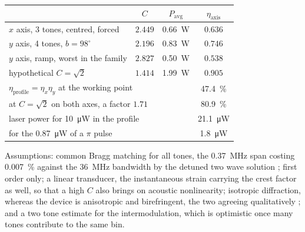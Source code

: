 \begin{center}
\begin{tabular}{lccc}
\hline
& $C$ & $P_\mathrm{avg}$ & $\eta_\mathrm{axis}$\\ \hline
$x$ axis, 3 tones, centred, forced & $2.449$ & \SI{0.66}{\watt} & $0.636$\\
$y$ axis, 4 tones, $b=98^\circ$ & $2.196$ & \SI{0.83}{\watt} & $0.746$\\
$y$ axis, ramp, worst in the family & $2.827$ & \SI{0.50}{\watt} & $0.538$\\
hypothetical $C=\sqrt{2}$ & $1.414$ & \SI{1.99}{\watt} & $0.905$\\ \hline
\multicolumn{3}{l}{$\eta_\mathrm{profile}=\eta_x\eta_y$ at the working point}
 & \SI{47.4}{\percent}\\
\multicolumn{3}{l}{at $C=\sqrt{2}$ on both axes, a factor $1.71$}
 & \SI{80.9}{\percent}\\
\multicolumn{3}{l}{laser power for \SI{10}{\micro \watt} in the profile}
 & \SI{21.1}{\micro \watt}\\
\multicolumn{3}{l}{for the \SI{0.87}{\micro \watt} of a $\pi$ pulse}
 & \SI{1.8}{\micro \watt}\\ \hline
\end{tabular}
\end{center}

\noindent Assumptions: common Bragg matching for all tones, the
\SI{0.37}{\mega \hertz} span costing \SI{0.007}{\percent} against the
\SI{36}{\mega \hertz} bandwidth by the detuned two wave solution
\cite{Kogelnik1969}; first order only; a linear transducer, the instantaneous
strain carrying the crest factor as well, so that a high $C$ also brings on
acoustic nonlinearity; isotropic diffraction, whereas the device is
anisotropic and birefringent, the two agreeing qualitatively \cite{Chang1995};
and a two tone estimate for the intermodulation, which is optimistic once many
tones contribute to the same bin.
